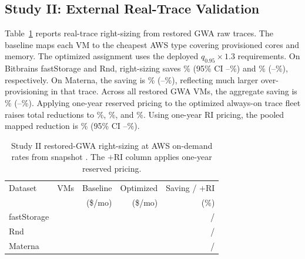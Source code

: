 \documentclass[conference]{IEEEtran}
\begin{document}
\begin{table}[t]
\caption{Study I synthetic-account walk-forward MAPE (\%, mean $\pm$ sd).
The source table is generated by \texttt{make\_figures.py}.}
\label{tab:mape}
\centering
\renewcommand{\arraystretch}{1.10}

\end{table}

\subsection{Study II: External Real-Trace Validation}
Table~\ref{tab:external} reports real-trace right-sizing from restored GWA
raw traces. The baseline maps each VM to the cheapest AWS type covering
provisioned cores and memory. The optimized assignment uses the deployed
$q_{0.95}\times1.3$ requirements. On Bitbrains fastStorage and Rnd,
right-sizing saves \extFsSavingsPct\% (95\% CI
\extFsSavingsCiLow--\extFsSavingsCiHigh\%) and \extRndSavingsPct\%
(\extRndSavingsCiLow--\extRndSavingsCiHigh\%), respectively. On Materna, the
saving is \extMatSavingsPct\% (\extMatSavingsCiLow--\extMatSavingsCiHigh\%),
reflecting much larger over-provisioning in that trace. Across all restored
GWA VMs, the aggregate saving is \extOverallSavingsPct\%
(\extOverallSavingsCiLow--\extOverallSavingsCiHigh\%). Applying one-year
reserved pricing to the optimized always-on trace fleet raises total
reductions to \extFsSavingsPctRi\%, \extRndSavingsPctRi\%, and
\extMatSavingsPctRi\%. Using one-year RI pricing, the pooled mapped reduction
is \extOverallSavingsPctRi\% (95\% CI
\extOverallSavingsPctRiCiLow--\extOverallSavingsPctRiCiHigh\%).

\begin{table}[t]
\caption{Study II restored-GWA right-sizing at AWS on-demand rates from
snapshot \extSnapshot. The $+$RI column applies one-year reserved pricing.}
\label{tab:external}
\centering
\renewcommand{\arraystretch}{1.08}
\setlength{\tabcolsep}{3.5pt}
\begin{tabular}{@{}l r r r r@{}}
\toprule
Dataset & VMs & Baseline & Optimized & Saving / $+$RI \\
 & & (\$/mo) & (\$/mo) & (\%) \\
\midrule
fastStorage & \extFsVms{} & \extFsBaseline{} & \extFsOptimized{} & \extFsSavingsPct{} / \extFsSavingsPctRi{} \\
Rnd & \extRndVms{} & \extRndBaseline{} & \extRndOptimized{} & \extRndSavingsPct{} / \extRndSavingsPctRi{} \\
Materna & \extMatVms{} & \extMatBaseline{} & \extMatOptimized{} & \extMatSavingsPct{} / \extMatSavingsPctRi{} \\
\bottomrule
\end{tabular}
\end{table}
\end{document}
